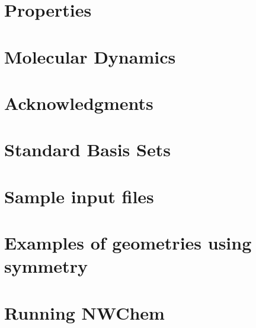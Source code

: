 \section{Properties}


\section{Molecular Dynamics}


\section{Acknowledgments}


\appendix

\section{Standard Basis Sets}


\section{Sample input files}


\section{Examples of geometries using symmetry}


\section{Running NWChem}



